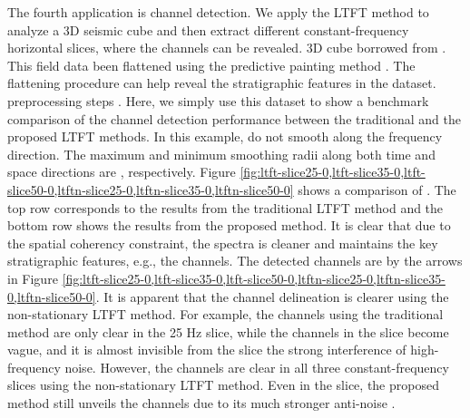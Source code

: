 The fourth application is channel detection. We apply the LTFT method to analyze a 3D seismic cube and then extract different constant-frequency horizontal slices, where the channels can be revealed.  3D cube borrowed from \cite{guochang20113}. This field data  been flattened using the predictive painting method \cite[]{fomel2010painting}. The flattening procedure can help reveal the stratigraphic features in the dataset.  preprocessing steps  \cite{guochang20113}. Here, we simply use this dataset to show a benchmark comparison of the channel detection performance between the traditional and the proposed LTFT methods. In this example,  do not smooth along the frequency direction. The maximum and minimum smoothing radii along both time and space directions are , respectively. Figure %
\ref{fig:ltft-slice25-0,ltft-slice35-0,ltft-slice50-0,ltftn-slice25-0,ltftn-slice35-0,ltftn-slice50-0}
shows a comparison of .
The top row corresponds to the results from the traditional LTFT method and the bottom row shows the results from the proposed method. It is clear that due to the spatial coherency constraint, the  spectra is cleaner and maintains the key stratigraphic features, e.g., the channels. The detected channels are  by the arrows in Figure %
\ref{fig:ltft-slice25-0,ltft-slice35-0,ltft-slice50-0,ltftn-slice25-0,ltftn-slice35-0,ltftn-slice50-0}.
It is apparent that the channel delineation is clearer using the non-stationary LTFT method. For example, the channels using the traditional method are only clear in the 25 Hz slice, while the channels in the  slice become vague, and it is almost invisible from the  slice  the strong interference of high-frequency noise. However, the channels are clear in all three constant-frequency slices using the non-stationary LTFT method. Even in the  slice, the proposed method still unveils the channels due to its much stronger anti-noise . 




